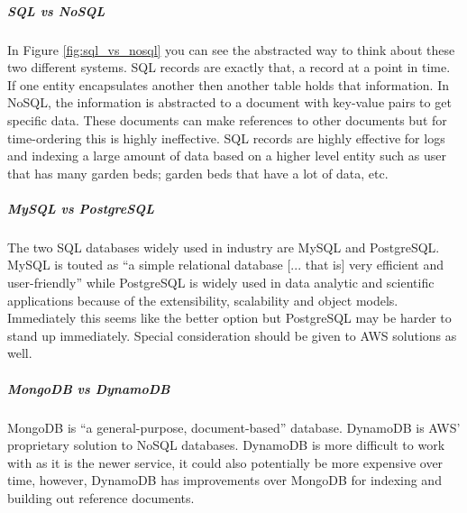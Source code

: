 \subparagraph{SQL vs NoSQL}
In Figure \ref{fig:sql_vs_nosql} you can see the abstracted way to think about these two different systems. SQL records are exactly that, a record at a point in time. If one entity encapsulates another then another table holds that information. In NoSQL, the information is abstracted to a document with key-value pairs to get specific data. These documents can make references to other documents but for time-ordering this is highly ineffective. SQL records are highly effective for logs and indexing a large amount of data based on a higher level entity such as user that has many garden beds; garden beds that have a lot of data, etc.

\subparagraph{MySQL vs PostgreSQL}
The two SQL databases widely used in industry are MySQL and PostgreSQL. MySQL is touted as ``a simple relational database [... that is] very efficient and user-friendly'' while PostgreSQL is widely used in data analytic and scientific applications because of the extensibility, scalability and object models. Immediately this seems like the better option but PostgreSQL may be harder to stand up immediately. Special consideration should be given to AWS solutions as well. 

\subparagraph{MongoDB vs DynamoDB}
MongoDB is ``a general-purpose, document-based'' database. DynamoDB is AWS' proprietary solution to NoSQL databases. DynamoDB is more difficult to work with as it is the newer service, it could also potentially be more expensive over time, however, DynamoDB has improvements over MongoDB for indexing and building out reference documents. 